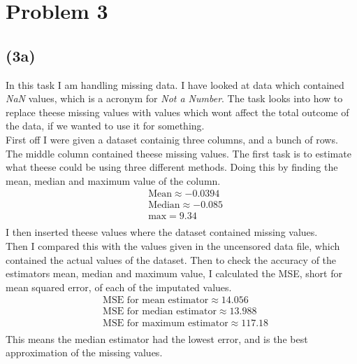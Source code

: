 \documentclass[12pt, letterpaper]{article}
\begin{document}
  \section*{Problem 3}
    \subsection*{(3a)}
      In this task I am handling missing data. I have looked at data which contained \textit{NaN} values, which is a acronym for \textit{Not a Number}. The task looks into how to replace theese missing values with values which wont affect the total outcome of the data, if we wanted to use it for something.\\
      First off I were given a dataset containig three columns, and a bunch of rows. The middle column contained theese missing values. The first task is to estimate what theese could be using three different methods. Doing this by finding the mean, median and maximum value of the column.\\
      \begin{align*}
        &\text{Mean} \approx -0.0394\\
        &\text{Median} \approx -0.085\\
        &\text{max} = 9.34\\
      \end{align*}
      I then inserted theese values where the dataset contained missing values.\\
      Then I compared this with the values given in the uncensored data file, which contained the actual values of the dataset. Then to check the accuracy of the estimators mean, median and maximum value, I calculated the MSE, short for mean squared error, of each of the imputated values.
      \begin{align*}
        &\text{MSE for mean estimator} \approx 14.056\\
        &\text{MSE for median estimator} \approx 13.988\\
        &\text{MSE for maximum estimator} \approx 117.18\\
      \end{align*}
      This means the median estimator had the lowest error, and is the best approximation of the missing values.
\end{document}

